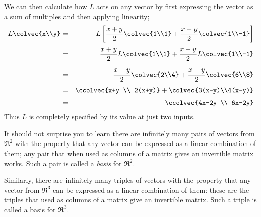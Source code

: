 \begin{example}
$$$$
We can then calculate how $L$ acts on any vector by first expressing the vector as  a sum of multiples and then applying linearity;
\begin{eqnarray*}
L\colvec{x\\y}
&=&L\left[    \frac{x+y}{2} \colvec{1\\1} + \frac{x-y}{2} \colvec{1\\-1}  \right]\\[1mm]
&=&\frac{x+y}{2} L \colvec{1\\1} + \frac{x-y}{2} L \colvec{1\\-1} \\[2mm]
&=&\frac{x+y}{2} \colvec{2\\4} + \frac{x-y}{2}  \colvec{6\\8} \\[1mm]
&=&\ccolvec{x+y \\ 2(x+y)} +  \colvec{3(x-y)\\4(x-y)}\\[1mm]
&=&\ccolvec{4x-2y \\ 6x-2y}
\end{eqnarray*}
Thus $L$ is completely specified by its value at just two inputs. 
\end{example}

It should not surprise you to learn there are infinitely many pairs of vectors from $\Re^2$ 
with the property that any vector can be expressed as a linear combination of them; any pair that when used as columns of a matrix gives an invertible matrix works. Such a pair is called a {\it basis} for $\Re^2$.

Similarly, there are infinitely many triples of vectors with the property that any vector from $\Re^3$ can be expressed as a linear combination of them: these are the triples that used as columns of a matrix give an invertible matrix. Such a triple is called a basis for $\Re^3$.

